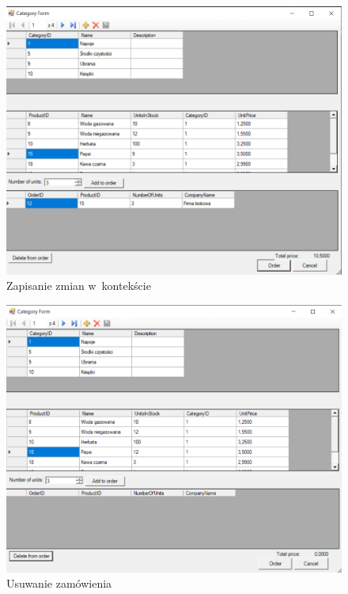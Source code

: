 \documentclass[12pt, a4paper]{mwart}
\begin{document}
\begin{figure}[ht]
  \centering
  \includegraphics[scale=0.5]{VI/6-4.png}
  \caption{Zapisanie zmian w~kontekście}
  \label{rys:6.4}
\end{figure}

\begin{figure}[ht]
  \centering
  \includegraphics[scale=0.5]{VI/6-5.png}
  \caption{Usuwanie zamówienia}
  \label{rys:6.5}
\end{figure}
\end{document}

